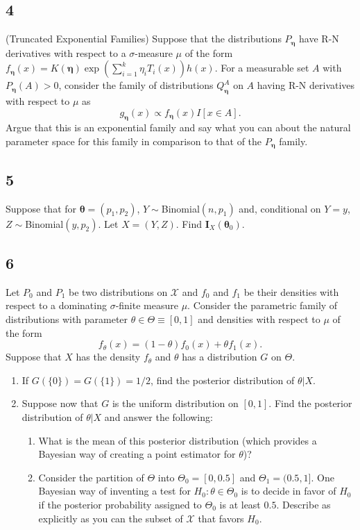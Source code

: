 \documentclass[12pt]{article}
\begin{document}
\subsection*{4}
\begin{tcolorbox}
(Truncated Exponential Families) Suppose that the distributions $P_{\bm{\eta}}$ have R-N derivatives with respect to a
$\sigma$-measure $\mu$ of the form $f_{\bm{\eta}}(x) = K(\bm{\eta}) \exp \left(  \sum_{i=1}^k \eta_i T_i(x)\right) h(x)$.
For a measurable set $A$ with $P_{\bm{\eta}}(A)>0$, consider the family of distributions $Q_{\bm{\eta}}^A$ on $A$ having R-N derivatives
with respect to $\mu$ as
\[
  g_{\bm{\eta}}(x ) \propto f_{\bm{\eta}}(x) I[x\in A].
\]
Argue that this is an exponential family and say what you can about the natural parameter space for this family in comparison to that of the $P_{\bm{\eta}}$ family.
\end{tcolorbox}


\subsection*{5}
\begin{tcolorbox}
  Suppose that for $\bm{\theta}=(p_1,p_2)$, $Y\sim$Binomial$(n,p_1)$ and, conditional on $Y=y$, $Z\sim$Binomial$(y,p_2)$. Let $X=(Y,Z)$.  Find $\bm{I}_{X}(\bm{\theta}_0)$.
\end{tcolorbox}


\subsection*{6}
\begin{tcolorbox}
  Let $P_0$ and $P_1$ be two distributions on $\mathcal{X}$ and $f_0$ and $f_1$ be their densities with respect to a dominating $\sigma$-finite
  measure $\mu$.  Consider the parametric family of distributions with parameter $\theta \in \Theta \equiv [0,1]$ and densities with respect to $\mu$
  of the form
  \[
    f_\theta(x) = (1-\theta) f_0(x) +\theta f_1(x).
  \]
  Suppose that $X$ has the density $f_\theta$ and $\theta$ has a distribution $G$ on $\Theta$.
  \begin{enumerate}
    \item If $G(\{0\})=G(\{1\})=1/2$, find the posterior distribution of $\theta|X$.
    \item Suppose now that $G$ is the uniform distribution on $[0,1]$.  Find the posterior distribution of $\theta|X$ and answer  the following:

      \begin{enumerate}
        \item What is the mean of this posterior distribution (which provides a Bayesian way of creating a point estimator for $\theta$)?
        \item Consider the partition of $\Theta$ into $\Theta_0=[0,0.5]$ and $\Theta_1=(0.5,1]$.  One Bayesian way of inventing a test for $H_0: \theta \in \Theta_0$ is to decide in favor of $H_0$ if the posterior probability assigned to $\Theta_0$ is at least $0.5$. Describe as explicitly as you can the subset of $\mathcal{X}$ that favors $H_0$.
      \end{enumerate}
  \end{enumerate}
\end{tcolorbox}
\end{document}
